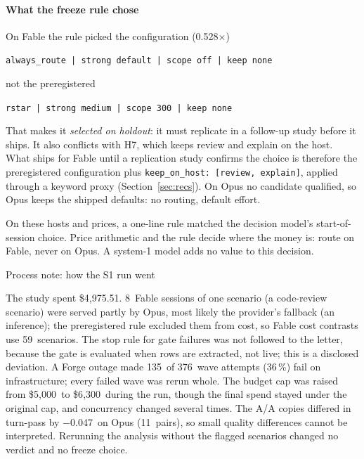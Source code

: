 \documentclass[11pt,letterpaper]{article}
\newcommand{\code}[1]{\texttt{#1}}
\newcommand{\X}{\ensuremath{\times}}
\newcommand{\SAttempts}{376}
\newcommand{\SBudgetFinal}{6{,}300}
\newcommand{\SBudgetOrig}{5{,}000}
\newcommand{\SFreezeFable}{always\_route | strong default | scope off | keep none}
\newcommand{\SFreezeFablePrereg}{rstar | strong medium | scope 300 | keep none}
\newcommand{\SFreezeFableRatio}{0.528}
\newcommand{\SGateFail}{8}
\newcommand{\SHOneN}{59}
\newcommand{\SInfraAttempts}{135}
\newcommand{\SInfraPct}{36}
\newcommand{\SNoiseN}{11}
\newcommand{\SNoiseOpusDtp}{$-$0.047}
\newcommand{\SSpend}{4{,}975.51}
\begin{document}
\paragraph{What the freeze rule chose} On Fable the rule picked the configuration (\SFreezeFableRatio\X)
\begin{center}\small\code{\SFreezeFable}\end{center}
not the preregistered
\begin{center}\small\code{\SFreezeFablePrereg}\end{center} That makes it \emph{selected on holdout}: it must replicate in a follow-up study before it
ships. It also conflicts with H7, which keeps review and explain on the host. What ships for Fable until a replication study confirms the choice is
therefore the preregistered configuration plus \code{keep\_on\_host: [review, explain]}, applied through a keyword proxy
(Section~\ref{sec:recs}). On Opus no candidate qualified, so
Opus keeps the shipped defaults: no routing, default effort.

\begin{keyidea}
On these hosts and prices, a one-line rule matched the decision model's start-of-session choice. Price arithmetic and
the rule decide where the money is: route on Fable, never on Opus. A system-1 model adds no value to this decision.
\end{keyidea}

\begin{processnote}{Process note: how the S1 run went}
\raggedright The study spent \$\SSpend. \SGateFail\ Fable sessions of one scenario
(a code-review scenario) were served partly by Opus, most likely the provider's fallback (an inference); the preregistered rule
excluded them from cost, so Fable cost contrasts use \SHOneN\ scenarios. The stop rule for gate failures was not followed
to the letter, because the gate is evaluated when rows are extracted, not live; this is a disclosed deviation. A Forge
outage made \SInfraAttempts\ of \SAttempts\ wave attempts (\SInfraPct\,\%) fail on infrastructure; every failed wave was
rerun whole. The budget cap was raised from \$\SBudgetOrig\ to \$\SBudgetFinal\ during the run, though the final spend
stayed under the original cap, and concurrency changed several times. The A/A copies differed in turn-pass by
\SNoiseOpusDtp\ on Opus (\SNoiseN\ pairs), so small quality differences cannot be interpreted. Rerunning the analysis
without the flagged scenarios changed no verdict and no freeze choice.
\end{processnote}
\end{document}
